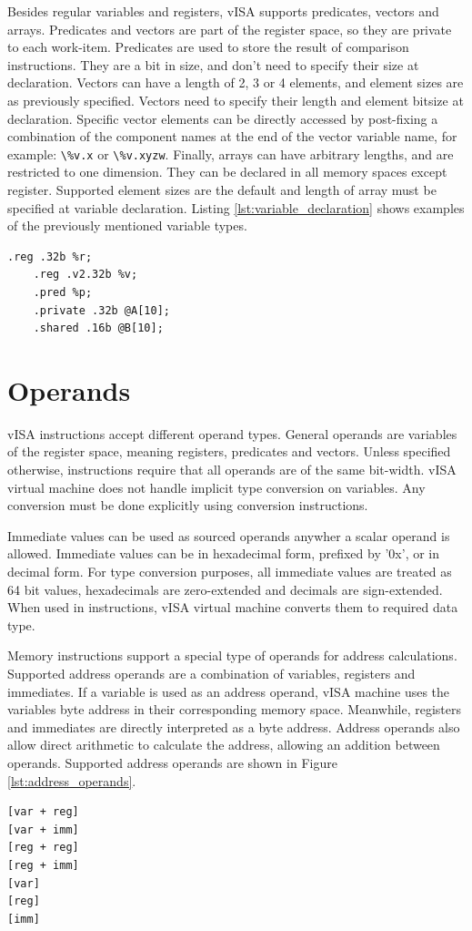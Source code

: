 Besides regular variables and registers, vISA supports predicates, vectors and
arrays. Predicates and vectors are part of the register space, so they are
private to each work-item. Predicates are used to store the result of
comparison instructions. They are a bit in size, and don't need to specify
their size at declaration. Vectors can have a length of 2, 3 or 4 elements, and
element sizes are as previously specified. Vectors need to specify their length
and element bitsize at declaration. Specific vector elements can be directly
accessed by post-fixing a combination of the component names at the end of the
vector variable name, for example: \lstinline{\%v.x} or \lstinline{\%v.xyzw}.
Finally, arrays can have arbitrary lengths, and are restricted to one
dimension. They can be declared in all memory spaces except register. Supported
element sizes are the default and length of array must be specified at variable
declaration. Listing \ref{lst:variable_declaration} shows examples of the
previously mentioned variable types.

\begin{lstlisting}[label={lst:variable_declaration}]
    .reg .32b %r;
    .reg .v2.32b %v;
    .pred %p;
    .private .32b @A[10];
    .shared .16b @B[10];
\end{lstlisting}

\section{Operands}
vISA instructions accept different operand types. General operands are
variables of the register space, meaning registers, predicates and vectors.
Unless specified otherwise, instructions require that all operands are of the
same bit-width. vISA virtual machine does not handle implicit type conversion
on variables. Any conversion must be done explicitly using conversion
instructions.

Immediate values can be used as sourced operands anywher a scalar operand is
allowed. Immediate values can be in hexadecimal form, prefixed by '0x', or in
decimal form. For type conversion purposes, all immediate values are treated as
64 bit values, hexadecimals are zero-extended and decimals are sign-extended.
When used in instructions, vISA virtual machine converts them to required data
type.

Memory instructions support a special type of operands for address
calculations. Supported address operands are a combination of variables,
registers and immediates. If a variable is used as an address operand, vISA
machine uses the variables byte address in their corresponding memory space.
Meanwhile, registers and immediates are directly interpreted as a byte address.
Address operands also allow direct arithmetic to calculate the address,
allowing an addition between operands. Supported address operands are shown in
Figure \ref{lst:address_operands}.
\begin{lstlisting}[label={lst:address_operands}]
[var + reg]
[var + imm]
[reg + reg]
[reg + imm]
[var]
[reg]
[imm]
\end{lstlisting}

